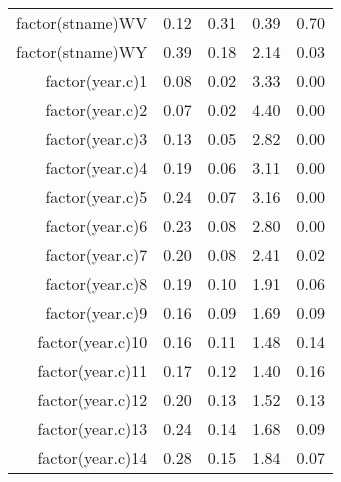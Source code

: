 \begin{table}[ht]
\begin{tabular}{rrrrr}
  factor(stname)WV & 0.12 & 0.31 & 0.39 & 0.70 \\ 
  factor(stname)WY & 0.39 & 0.18 & 2.14 & 0.03 \\ 
  factor(year.c)1 & 0.08 & 0.02 & 3.33 & 0.00 \\ 
  factor(year.c)2 & 0.07 & 0.02 & 4.40 & 0.00 \\ 
  factor(year.c)3 & 0.13 & 0.05 & 2.82 & 0.00 \\ 
  factor(year.c)4 & 0.19 & 0.06 & 3.11 & 0.00 \\ 
  factor(year.c)5 & 0.24 & 0.07 & 3.16 & 0.00 \\ 
  factor(year.c)6 & 0.23 & 0.08 & 2.80 & 0.00 \\ 
  factor(year.c)7 & 0.20 & 0.08 & 2.41 & 0.02 \\ 
  factor(year.c)8 & 0.19 & 0.10 & 1.91 & 0.06 \\ 
  factor(year.c)9 & 0.16 & 0.09 & 1.69 & 0.09 \\ 
  factor(year.c)10 & 0.16 & 0.11 & 1.48 & 0.14 \\ 
  factor(year.c)11 & 0.17 & 0.12 & 1.40 & 0.16 \\ 
  factor(year.c)12 & 0.20 & 0.13 & 1.52 & 0.13 \\ 
  factor(year.c)13 & 0.24 & 0.14 & 1.68 & 0.09 \\ 
  factor(year.c)14 & 0.28 & 0.15 & 1.84 & 0.07 \\ 
   \hline
\end{tabular}
\end{table}
